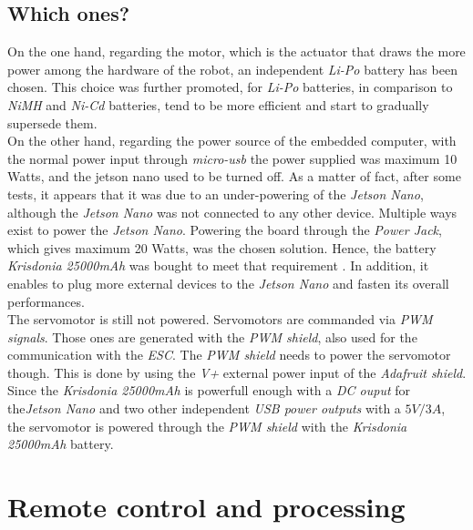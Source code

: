 		\subsection{Which ones?}
		On the one hand, regarding the motor, which is the actuator that 
		draws the more power among the hardware of the robot, an independent 
		\textit{Li-Po} battery has been chosen. This choice
		was further promoted, for \textit{Li-Po} batteries, in 
		comparison to \textit{NiMH} and \textit{Ni-Cd} batteries, 
		tend to be more efficient and start to gradually 
		supersede them.
		\\\indent On the other hand, regarding the power source of the embedded computer, with 
		the normal power input through \textit{micro-usb} the power supplied
		was maximum 10 Watts, and the jetson nano used to be turned off. As a matter of fact,
		after some tests, it appears that it was due to an under-powering of the 
		\textit{Jetson Nano}, although the \textit{Jetson Nano} was not connected
		to any other device. Multiple ways exist to power the \textit{Jetson Nano}.
		Powering the board through the \textit{Power Jack}, which gives maximum 20 Watts, 
		was the chosen solution. Hence, the battery \textit{Krisdonia 25000mAh} was bought to meet that 
		requirement \cite{nanopowerbank}. In addition, it enables to plug more external devices to the \textit{Jetson Nano}
		and fasten its overall performances.
		\\\indent The servomotor is still not powered. Servomotors are commanded
		via \textit{PWM signals}. Those ones are generated with the \textit{PWM shield}, also 
		used for the communication with the \textit{ESC}. The \textit{PWM shield} needs to power the 
		servomotor though. This is done by using the \textit{V+} external power input of
		the \textit{Adafruit shield}. Since the \textit{Krisdonia 25000mAh} is powerfull 
		enough with a \textit{DC ouput} for the\textit{Jetson Nano} and two other independent
		\textit{USB power outputs} with a $5V/3A$, the servomotor is powered through the \textit{PWM shield}
		with the \textit{Krisdonia 25000mAh} battery.
		\cite{jetsonhacksmorepower,nanoguide,elinuxdoc}
		
	\section{Remote control and processing}
		
